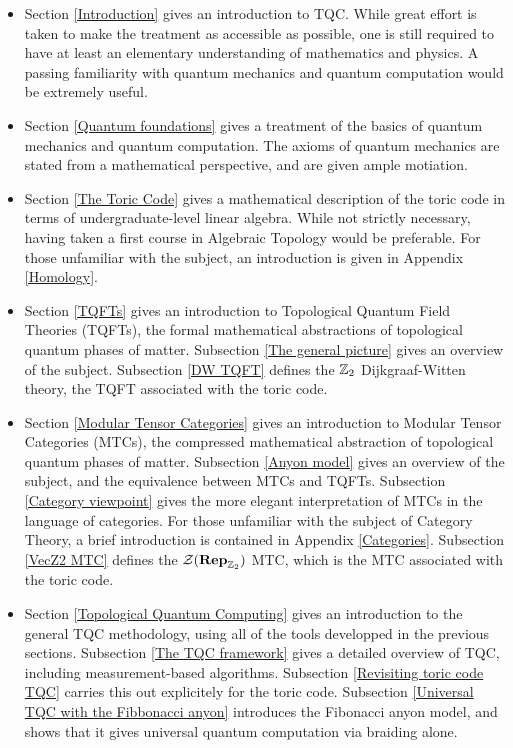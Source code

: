 \documentclass{article}
\theoremstyle{definition}
\numberwithin{figure}{section}
\begin{document}
\begin{itemize}
\item Section \ref{Introduction} gives an introduction to TQC. While great effort is taken to make the treatment as accessible as possible, one is still required to have at least an elementary understanding of mathematics and physics. A passing familiarity with quantum mechanics and quantum computation would be extremely useful.

\item Section \ref{Quantum foundations} gives a treatment of the basics of quantum mechanics and quantum computation. The axioms of quantum mechanics are stated from a mathematical perspective, and are given ample motiation.

\item Section \ref{The Toric Code} gives a mathematical description of the toric code in terms of undergraduate-level linear algebra. While not strictly necessary, having taken a first course in Algebraic Topology would be preferable. For those unfamiliar with the subject, an introduction is given in Appendix \ref{Homology}. 

\item Section \ref{TQFTs} gives an introduction to Topological Quantum Field Theories (TQFTs), the formal mathematical abstractions of topological quantum phases of matter. Subsection \ref{The general picture} gives an overview of the subject. Subsection \ref{DW TQFT} defines the $\mathbb{Z}_2$ Dijkgraaf-Witten theory, the TQFT associated with the toric code.

\item Section \ref{Modular Tensor Categories} gives an introduction to Modular Tensor Categories (MTCs), the compressed mathematical abstraction of topological quantum phases of matter. Subsection \ref{Anyon model} gives an overview of the subject, and the equivalence between MTCs and TQFTs. Subsection \ref{Category viewpoint} gives the more elegant interpretation of MTCs in the language of categories. For those unfamiliar with the subject of Category Theory, a brief introduction is contained in Appendix \ref{Categories}. Subsection \ref{VecZ2 MTC} defines the $\mathcal{Z}(\bold{Rep}_{\mathbb{Z}_2})$ MTC, which is the MTC associated with the toric code.

\item Section \ref{Topological Quantum Computing} gives an introduction to the general TQC methodology, using all of the tools developped in the previous sections. Subsection \ref{The TQC framework} gives a detailed overview of TQC, including measurement-based algorithms. Subsection \ref{Revisiting toric code TQC} carries this out explicitely for the toric code. Subsection \ref{Universal TQC with the Fibbonacci anyon} introduces the Fibonacci anyon model, and shows that it gives universal quantum computation via braiding alone.

\end{itemize}
\end{document}
